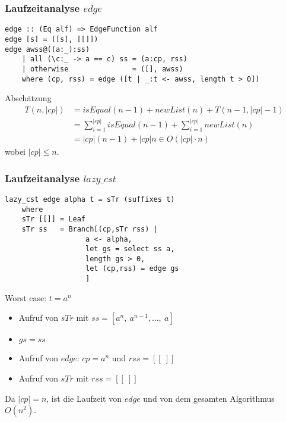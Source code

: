 \documentclass{beamer}
\newcommand{\abs}[1]{\left|#1\right|}
\begin{document}
\begin{frame}[fragile]
\frametitle{Laufzeitanalyse $edge$}
\begin{lstlisting}
edge :: (Eq alf) => EdgeFunction alf
edge [s] = ([s], [[]])
edge awss@((a:_):ss)
    | all (\c:_ -> a == c) ss = (a:cp, rss)
    | otherwise               = ([], awss)
    where (cp, rss) = edge ([t | _:t <- awss, length t > 0])
\end{lstlisting}
\begin{block}{Abschätzung}
\vspace{-8mm}
\begin{align*}
    T(n,\abs{cp}) &= isEqual(n - 1) + newList(n) + T(n-1,\abs{cp}-1) \\
             &= \sum_{i = 1}^{\abs{cp}}{isEqual(n-1)} + \sum_{i = 1}^{\abs{cp}}{newList(n)} \\
             &= \abs{cp} (n - 1) + \abs{cp} n \in O(\abs{cp} \cdot n)
\end{align*}
wobei $|cp| \le n$.
\end{block}
\end{frame}

\begin{frame}[fragile]
\frametitle{Laufzeitanalyse $lazy\_cst$}
\begin{lstlisting}
lazy_cst edge alpha t = sTr (suffixes t)
    where
    sTr [[]] = Leaf
    sTr ss   = Branch[(cp,sTr rss) |
                   a <- alpha,
                   let gs = select ss a,
                   length gs > 0,
                   let (cp,rss) = edge gs
                   ]
\end{lstlisting}
\begin{block}{Worst case: $t = a^n$}
\begin{itemize}
    \item Aufruf von $sTr$ mit $ss = [a^n,\:a^{n-1}, \dots ,\:a]$
    \item $gs = ss$
    \item Aufruf von $edge$: $cp = a^n$ und $rss = [[\:]]$
    \item Aufruf von $sTr$ mit $rss = [[\:]]$
\end{itemize}
Da $|cp| = n$, ist die Laufzeit von $edge$ und von dem gesamten Algorithmus $O(n^2)$.
\end{block}
\end{frame}
\end{document}
